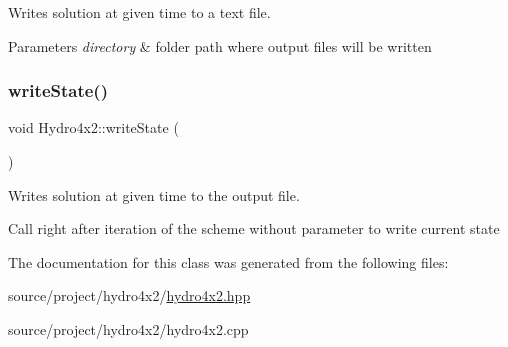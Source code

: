 Writes solution at given time to a text file. 


\begin{DoxyParams}{Parameters}
{\em directory} & folder path where output files will be written \\
\hline
\end{DoxyParams}
\mbox{\label{classHydro4x2_ab1e5cb653e1f2bfc2965b80581bb0b86}} 
\subsubsection{\texorpdfstring{write\+State()}{writeState()}\hspace{0.1cm}{\footnotesize\ttfamily [2/2]}}
{\footnotesize\ttfamily void Hydro4x2\+::write\+State (\begin{DoxyParamCaption}{ }\end{DoxyParamCaption})}



Writes solution at given time to the output file. 

Call right after iteration of the scheme without parameter to write current state 

The documentation for this class was generated from the following files\+:\begin{DoxyCompactItemize}
\item 
source/project/hydro4x2/\mbox{\hyperlink{hydro4x2_8hpp}{hydro4x2.\+hpp}}\item 
source/project/hydro4x2/hydro4x2.\+cpp\end{DoxyCompactItemize}

